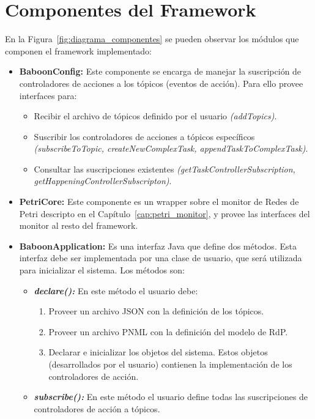 \section{Componentes del Framework}
\label{sec:componentes_baboon}
En la Figura~\ref{fig:diagrama_componentes} se pueden observar los
módulos que componen el framework implementado:
\begin{itemize}
  \item \textbf{BaboonConfig: } Este componente se encarga de manejar la
  suscripción de controladores de acciones a los tópicos (eventos de acción).
  Para ello provee interfaces para:
	  \begin{itemize}
	    \item Recibir el archivo de tópicos definido por el usuario
	    \emph{(addTopics)}.
	    \item Suscribir los controladores de acciones a tópicos específicos
	    \emph{(subscribeToTopic, createNewComplexTask, appendTaskToComplexTask)}.
	    \item Consultar las suscripciones existentes
	    \emph{(getTaskControllerSubscription,
	    getHappeningControllerSubscripton)}.
	  \end{itemize}
	  
  \item \textbf{PetriCore: } Este componente es un wrapper sobre el monitor de
  Redes de Petri descripto en el
  Capítulo~\ref{cap:petri_monitor}, y provee las interfaces del
  monitor al resto del framework.
  
  \item \textbf{BaboonApplication: } Es una interfaz Java que define dos
  métodos. Esta interfaz debe ser implementada por una clase de usuario, que
  será utilizada para inicializar el sistema. Los métodos son:
      \begin{itemize}
        \item \textbf{\emph{declare(): }} En este método el usuario debe:
        	\begin{enumerate}
        	  \item Proveer un archivo JSON con la definición de los tópicos.
        	  \item Proveer un archivo PNML con la definición del modelo de RdP.
        	  \item Declarar e inicializar los objetos del sistema. Estos objetos
        	  (desarrollados por el usuario) contienen la implementación
        	  de los controladores de acción.
        	\end{enumerate}
        \item \textbf{\emph{subscribe(): }} En este método el usuario define todas
        las suscripciones de controladores de acción a tópicos.
       \end{itemize}
   

\end{itemize}
